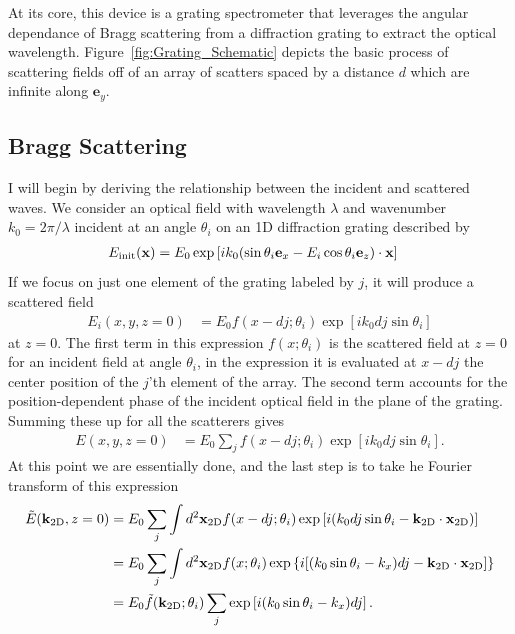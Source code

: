 \documentclass[letterpaper,preprint,aps,pra,superscriptaddress]{revtex4-1}
\def\ex{\mathbf{e}_x}
\def\ey{\mathbf{e}_y}
\def\ez{\mathbf{e}_z}
\begin{document}
At its core, this device is a grating spectrometer that leverages the angular dependance of Bragg scattering from a diffraction grating to extract the optical wavelength.  Figure~\ref{fig:Grating_Schematic} depicts the basic process of scattering fields off of an array of scatters spaced by a distance $d$ which are infinite along $\ey$.  

\subsection{Bragg Scattering}

I will begin by deriving the relationship between the incident and scattered waves.  We consider an optical field with wavelength $\lambda$ and wavenumber $k_0 = 2\pi/\lambda$ incident at an angle $\theta_i$ on an 1D diffraction grating described by
\begin{align}
E_{\rm init}({\bf x}) &= E_0 \exp\left[i k_0 (\sin\theta_i \ex - E_i \cos\theta_i\ez)\cdot{\bf x} \right]
\end{align}
If we focus on just one element of the grating labeled by $j$, it will produce a scattered field 
\begin{align}
E_i(x,y,z=0) &= E_0 f(x-dj;\theta_i) \exp\left[i k_0 d j \sin\theta_i \right]
\end{align}
at $z=0$.  The first term in this expression $f(x;\theta_i)$ is the scattered field at $z=0$ for an incident field at angle $\theta_i$, in the expression it is evaluated at $x-dj$ the center position of the $j$'th element of the array.  The second term accounts for the position-dependent phase of the incident optical field in the plane of the grating.  Summing these up for all the scatterers gives
\begin{align}
E(x,y,z=0) &= E_0 \sum_j f(x-dj;\theta_i) \exp\left[i k_0 d j \sin\theta_i \right].
\end{align}
At this point we are essentially done, and the last step is to take he Fourier transform of this expression
\begin{align}
\tilde E({\bf k}_{\rm 2D},z=0) &= E_0 \sum_j \int d^2 {\bf x}_{\rm 2D} f(x-dj;\theta_i) \exp\left[i (k_0 d j \sin\theta_i - {\bf k}_{\rm 2D}\cdot{\bf x}_{\rm 2D}) \right] \\
&= E_0 \sum_j \int d^2 {\bf x}_{\rm 2D} f(x;\theta_i) \exp\left\{i [(k_0 \sin\theta_i - k_x) d j - {\bf k}_{\rm 2D}\cdot{\bf x}_{\rm 2D}] \right\}\\
&= E_0 \tilde f({\bf k}_{\rm 2D};\theta_i) \sum_j \exp\left[i (k_0 \sin\theta_i - k_x) d j \right].
\end{align}
\end{document}
